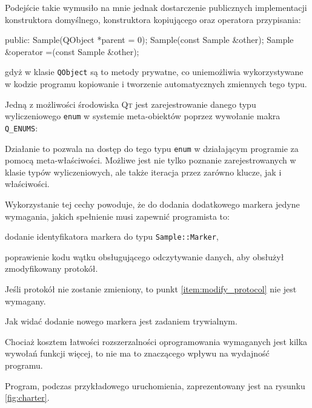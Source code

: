 Podejście takie wymusiło na mnie jednak dostarczenie publicznych implementacji konstruktora domyślnego, konstruktora kopiującego oraz operatora przypisania:
\begin{verbatimtab}
public:
	Sample(QObject *parent = 0);
	Sample(const Sample &other);
	Sample &operator =(const Sample &other);
\end{verbatimtab}
gdyż w klasie \verb|QObject| są to metody prywatne, co uniemożliwia wykorzystywane w kodzie programu kopiowanie i tworzenie automatycznych zmiennych tego typu.

Jedną z możliwości środowiska \textsc{Qt} jest zarejestrowanie danego typu wyliczeniowego \verb|enum| w systemie meta-obiektów poprzez wywołanie makra \verb|Q_ENUMS|:
\begin{verbatimtab}
class Sample : public QObject
{
	Q_OBJECT;
	Q_ENUMS(Marker);
public:
	enum Marker {Blue = 1, Yellow = 2};
	(...)
\end{verbatimtab}

Działanie to pozwala na dostęp do tego typu \verb|enum| w działającym programie za pomocą meta-właściwości. Możliwe jest nie tylko poznanie zarejestrowanych w klasie typów wyliczeniowych, ale także iteracja przez zarówno klucze, jak i właściwości.

Wykorzystanie tej cechy powoduje, że do dodania dodatkowego markera jedyne wymagania, jakich spełnienie musi zapewnić programista to:
\begin{aenumerate}
  \item dodanie identyfikatora markera do typu \verb|Sample::Marker|,
  \item poprawienie kodu wątku obsługującego odczytywanie danych, aby obsłużył zmodyfikowany protokół.\label{item:modify_protocol}
\end{aenumerate}

Jeśli protokół nie zostanie zmieniony, to punkt \ref{item:modify_protocol} nie jest wymagany.

Jak widać dodanie nowego markera jest zadaniem trywialnym.

Chociaż kosztem łatwości rozszerzalności oprogramowania wymaganych jest kilka wywołań funkcji więcej, to nie ma to znaczącego wpływu na wydajność programu.

Program, podczas przykładowego uruchomienia, zaprezentowany jest na rysunku \ref{fig:charter}.

